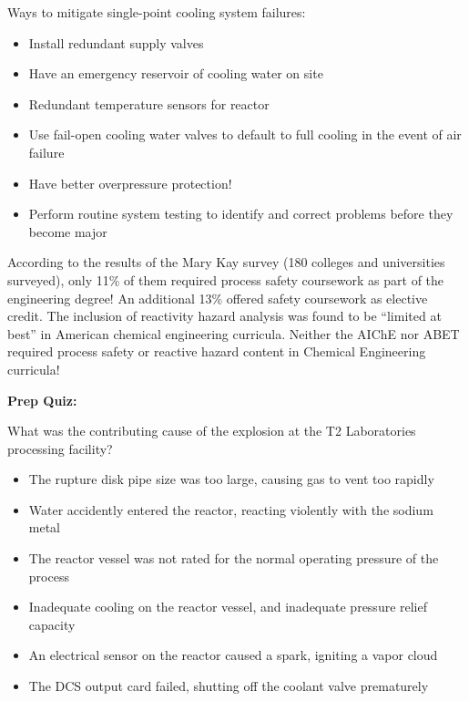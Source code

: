 \vskip 10pt

Ways to mitigate single-point cooling system failures: 

\begin{itemize}
\item{} Install redundant supply valves
\item{} Have an emergency reservoir of cooling water on site
\item{} Redundant temperature sensors for reactor
\item{} Use fail-open cooling water valves to default to full cooling in the event of air failure
\item{} Have better overpressure protection!
\item{} Perform routine system testing to identify and correct problems before they become major
\end{itemize}

\vskip 10pt

According to the results of the Mary Kay survey (180 colleges and universities surveyed), only 11\% of them required process safety coursework as part of the engineering degree!  An additional 13\% offered safety coursework as elective credit.  The inclusion of reactivity hazard analysis was found to be ``limited at best'' in American chemical engineering curricula.  Neither the AIChE nor ABET required process safety or reactive hazard content in Chemical Engineering curricula!


\vfil \eject

\noindent
{\bf Prep Quiz:}

What was the contributing cause of the explosion at the T2 Laboratories processing facility?

\begin{itemize}
\item{} The rupture disk pipe size was too large, causing gas to vent too rapidly
\vskip 5pt 
\item{} Water accidently entered the reactor, reacting violently with the sodium metal
\vskip 5pt 
\item{} The reactor vessel was not rated for the normal operating pressure of the process
\vskip 5pt 
\item{} Inadequate cooling on the reactor vessel, and inadequate pressure relief capacity
\vskip 5pt 
\item{} An electrical sensor on the reactor caused a spark, igniting a vapor cloud
\vskip 5pt 
\item{} The DCS output card failed, shutting off the coolant valve prematurely
\end{itemize}






